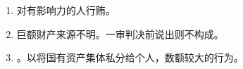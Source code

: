 \begin{enumerate}
\begin{enumerate}
{                  丙向乙提及此事，并要求丙把钱。
                  后丙，}。
                \begin{enumerate}
                  \item {}。
                  \item {}。
                  \item {}。
                \end{enumerate}
        \end{enumerate}
  \item 对有影响力的人行贿。
  \item 巨额财产来源不明。一审判决前说出则不构成。
  \item {}。以将国有资产集体私分给个人，数额较大的行为。
\end{enumerate}

